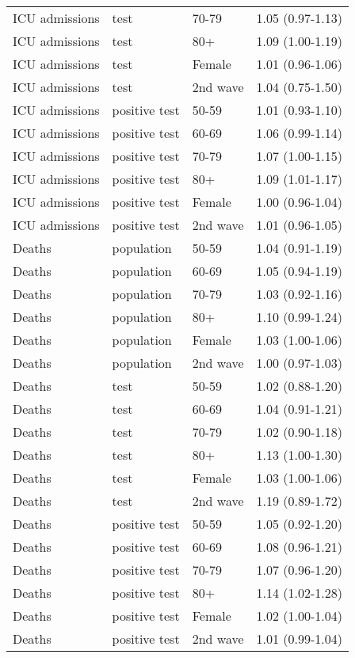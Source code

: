 \documentclass{article}
\begin{document}
\begin{longtable}{llll}
		ICU admissions & test & 70-79 & 1.05 (0.97-1.13) \\ 
		ICU admissions & test & 80+ & 1.09 (1.00-1.19) \\ 
		ICU admissions & test & Female & 1.01 (0.96-1.06) \\ 
		ICU admissions & test & 2nd wave & 1.04 (0.75-1.50) \\ 
		ICU admissions & positive test & 50-59 & 1.01 (0.93-1.10) \\ 
		ICU admissions & positive test & 60-69 & 1.06 (0.99-1.14) \\ 
		ICU admissions & positive test & 70-79 & 1.07 (1.00-1.15) \\ 
		ICU admissions & positive test & 80+ & 1.09 (1.01-1.17) \\ 
		ICU admissions & positive test & Female & 1.00 (0.96-1.04) \\ 
		ICU admissions & positive test & 2nd wave & 1.01 (0.96-1.05) \\ 
		Deaths & population & 50-59 & 1.04 (0.91-1.19) \\ 
		Deaths & population & 60-69 & 1.05 (0.94-1.19) \\ 
		Deaths & population & 70-79 & 1.03 (0.92-1.16) \\ 
		Deaths & population & 80+ & 1.10 (0.99-1.24) \\ 
		Deaths & population & Female & 1.03 (1.00-1.06) \\ 
		Deaths & population & 2nd wave & 1.00 (0.97-1.03) \\ 
		Deaths & test & 50-59 & 1.02 (0.88-1.20) \\ 
		Deaths & test & 60-69 & 1.04 (0.91-1.21) \\ 
		Deaths & test & 70-79 & 1.02 (0.90-1.18) \\ 
		Deaths & test & 80+ & 1.13 (1.00-1.30) \\ 
		Deaths & test & Female & 1.03 (1.00-1.06) \\ 
		Deaths & test & 2nd wave & 1.19 (0.89-1.72) \\ 
		Deaths & positive test & 50-59 & 1.05 (0.92-1.20) \\ 
		Deaths & positive test & 60-69 & 1.08 (0.96-1.21) \\ 
		Deaths & positive test & 70-79 & 1.07 (0.96-1.20) \\ 
		Deaths & positive test & 80+ & 1.14 (1.02-1.28) \\ 
		Deaths & positive test & Female & 1.02 (1.00-1.04) \\ 
		Deaths & positive test & 2nd wave & 1.01 (0.99-1.04) \\ 
			\hline
		\end{longtable}
	
\end{document}
